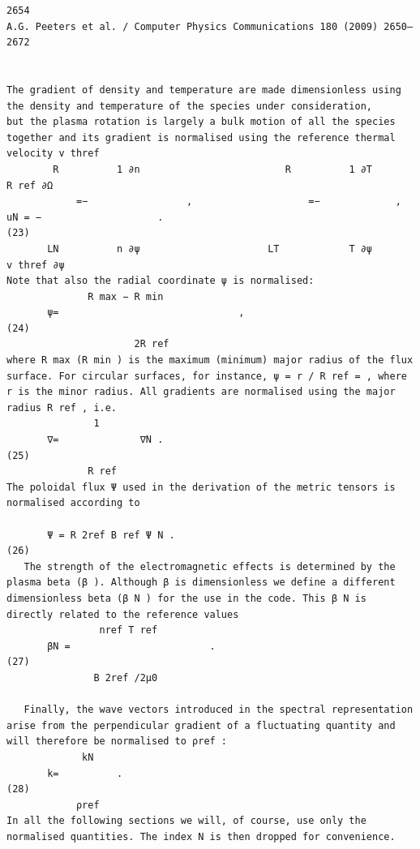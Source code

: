 \documentclass[a4paper]{article}
\newcommand{\gkwpagefont}{\fontsize{6.0pt}{7.55pt}\selectfont}
\begin{document}
\begin{Verbatim}[fontsize=\gkwpagefont]
2654                                                               A.G. Peeters et al. / Computer Physics Communications 180 (2009) 2650–2672


The gradient of density and temperature are made dimensionless using the density and temperature of the species under consideration,
but the plasma rotation is largely a bulk motion of all the species together and its gradient is normalised using the reference thermal
velocity v thref
        R          1 ∂n                         R          1 ∂T                          R ref ∂Ω
            =−                 ,                    =−             ,        uN = −                    .                                         (23)
       LN          n ∂ψ                      LT            T ∂ψ                          v thref ∂ψ
Note that also the radial coordinate ψ is normalised:
              R max − R min
       ψ=                               ,                                                                                                       (24)
                      2R ref
where R max (R min ) is the maximum (minimum) major radius of the flux surface. For circular surfaces, for instance, ψ = r / R ref = , where
r is the minor radius. All gradients are normalised using the major radius R ref , i.e.
               1
       ∇=              ∇N .                                                                                                                     (25)
              R ref
The poloidal flux Ψ used in the derivation of the metric tensors is normalised according to

       Ψ = R 2ref B ref Ψ N .                                                                                                                   (26)
   The strength of the electromagnetic effects is determined by the plasma beta (β ). Although β is dimensionless we define a different
dimensionless beta (β N ) for the use in the code. This β N is directly related to the reference values
                nref T ref
       βN =                        .                                                                                                            (27)
               B 2ref /2μ0

   Finally, the wave vectors introduced in the spectral representation arise from the perpendicular gradient of a fluctuating quantity and
will therefore be normalised to ρref :
             kN
       k=          .                                                                                                                            (28)
            ρref
In all the following sections we will, of course, use only the normalised quantities. The index N is then dropped for convenience.


\end{Verbatim}
\end{document}
